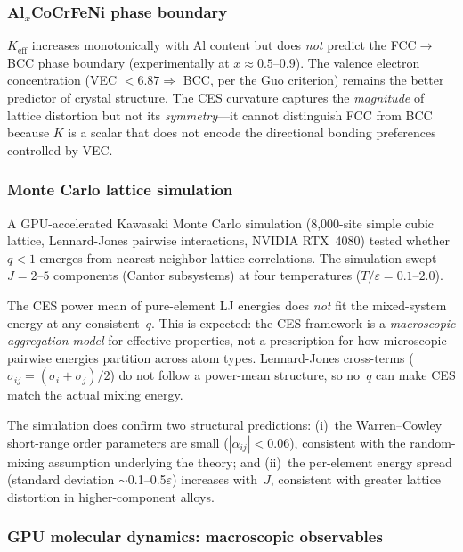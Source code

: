 \documentclass[12pt,letterpaper]{article}
\theoremstyle{definition}
\begin{document}
\subsubsection{Al$_x$CoCrFeNi phase boundary}

$K_{\mathrm{eff}}$ increases monotonically with Al content but does \emph{not} predict the FCC$\to$BCC phase boundary (experimentally at $x \approx 0.5$--$0.9$).  The valence electron concentration (VEC $< 6.87 \Rightarrow$ BCC, per the Guo criterion) remains the better predictor of crystal structure.  The CES curvature captures the \emph{magnitude} of lattice distortion but not its \emph{symmetry}---it cannot distinguish FCC from BCC because $K$ is a scalar that does not encode the directional bonding preferences controlled by VEC.

\subsubsection{Monte Carlo lattice simulation}

A GPU-accelerated Kawasaki Monte Carlo simulation (8{,}000-site simple cubic lattice, Lennard-Jones pairwise interactions, NVIDIA RTX~4080) tested whether $q < 1$ emerges from nearest-neighbor lattice correlations.  The simulation swept $J = 2$--$5$ components (Cantor subsystems) at four temperatures ($T/\varepsilon = 0.1$--$2.0$).

The CES power mean of pure-element LJ energies does \emph{not} fit the mixed-system energy at any consistent~$q$.  This is expected: the CES framework is a \emph{macroscopic aggregation model} for effective properties, not a prescription for how microscopic pairwise energies partition across atom types.  Lennard-Jones cross-terms ($\sigma_{ij} = (\sigma_i + \sigma_j)/2$) do not follow a power-mean structure, so no~$q$ can make CES match the actual mixing energy.

The simulation does confirm two structural predictions: (i)~the Warren--Cowley short-range order parameters are small ($|\alpha_{ij}| < 0.06$), consistent with the random-mixing assumption underlying the theory; and (ii)~the per-element energy spread (standard deviation $\sim$0.1--0.5$\varepsilon$) increases with~$J$, consistent with greater lattice distortion in higher-component alloys.

\subsubsection{GPU molecular dynamics: macroscopic observables}
\end{document}
